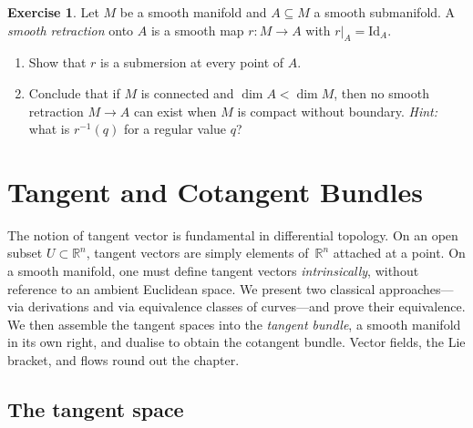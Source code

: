 \documentclass[12pt,a4paper,openany]{book}
\theoremstyle{definition}
\newtheorem{exercise}{Exercise}[chapter]
\theoremstyle{remark}
\newcommand{\R}{\mathbb{R}}
\newcommand{\Id}{\mathrm{Id}}
\begin{document}
\begin{exercise}\label{exo:smooth-retraction}
Let $M$ be a smooth manifold and $A \subseteq M$ a smooth submanifold.  A
\emph{smooth retraction} onto $A$ is a smooth map $r \colon M \to A$ with
$r|_A = \Id_A$.
\begin{enumerate}[label=(\alph*)]
  \item Show that $r$ is a submersion at every point of $A$.
  \item Conclude that if $M$ is connected and $\dim A < \dim M$, then no
    smooth retraction $M \to A$ can exist when $M$ is compact without
    boundary.  \textit{Hint:} what is $r^{-1}(q)$ for a regular value $q$?
\end{enumerate}
\end{exercise}



\chapter{Tangent and Cotangent Bundles}\label{ch:tangent-cotangent}
\minitoc\bigskip

The notion of tangent vector is fundamental in differential topology.
On an open subset $U \subset \R^n$, tangent vectors are simply elements
of~$\R^n$ attached at a point.  On a smooth manifold, one must define
tangent vectors \emph{intrinsically}, without reference to an ambient
Euclidean space.  We present two classical approaches---via derivations
and via equivalence classes of curves---and prove their equivalence.
We then assemble the tangent spaces into the \emph{tangent bundle}, a
smooth manifold in its own right, and dualise to obtain the cotangent
bundle.  Vector fields, the Lie bracket, and flows round out the chapter.

\section{The tangent space}\label{sec:tangent-space}
\end{document}
